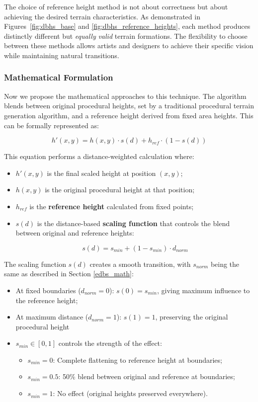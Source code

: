 The choice of reference height method is not about correctness but about achieving the desired terrain characteristics. As demonstrated in Figures~\ref{fig:dbhs_base} and \ref{fig:dbhs_reference_heights}, each method produces distinctly different but \textit{equally} \textit{valid} terrain formations. The flexibility to choose between these methods allows artists and designers to achieve their specific vision while maintaining natural transitions.

\subsubsection{Mathematical Formulation}
Now we propose the mathematical approaches to this technique. The algorithm blends between original procedural heights, set by a traditional procedural terrain generation algorithm, and a reference height derived from fixed area heights. This can be formally represented as:

\[ h'(x, y) = h(x, y) \cdot s(d) + h_{ref} \cdot (1 - s(d)) \]

This equation performs a distance-weighted calculation where:

\begin{itemize}
    \item $h'(x,y)$ is the final scaled height at position $(x,y)$;
    \item $h(x,y)$ is the original procedural height at that position;
    \item  $h_{ref}$ is the \textbf{reference height} calculated from fixed points;
    \item $s(d)$ is the distance-based \textbf{scaling function} that controls the blend between original and reference heights:
    
    \[ s(d) = s_{min} + (1 - s_{min}) \cdot d_{norm} \]
\end{itemize}


The scaling function $s(d)$ creates a smooth transition, with $s_{norm}$ being the same as described in Section \ref{edbs_math}:
\begin{itemize}
    \item At fixed boundaries ($d_{norm} = 0$): $s(0) = s_{min}$, giving maximum influence to the reference height;
    \item At maximum distance ($d_{norm} = 1$): $s(1) = 1$, preserving the original procedural height
    \item $s_{min} \in [0, 1]$ controls the strength of the effect:
        \begin{itemize}
            \item $s_{min} = 0$: Complete flattening to reference height at boundaries;
            \item $s_{min} = 0.5$: 50\% blend between original and reference at boundaries;
            \item $s_{min} = 1$: No effect (original heights preserved everywhere).
        \end{itemize}
\end{itemize}

